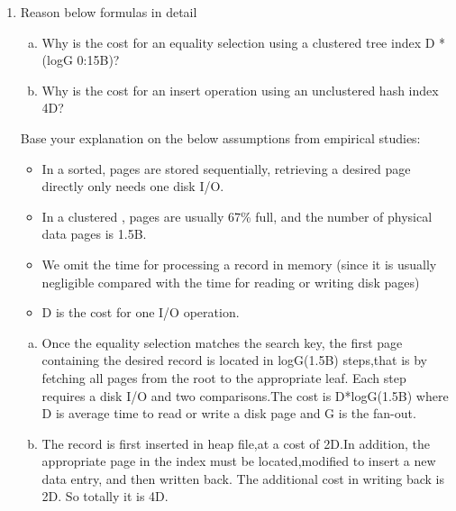 \documentclass[10pt]{article}
\begin{document}
	\begin{enumerate}
		\item Reason below formulas in detail
		
			\begin{enumerate}[(a)]
				\item Why is the cost for an equality selection using a clustered tree index D * (logG 0:15B)?
				
				\item Why is the cost for an insert operation using an unclustered hash index 4D?
			\end{enumerate}
			
			Base your explanation on the below assumptions from empirical studies:
			
			\begin{itemize}
				\item In a sorted, pages are stored sequentially, retrieving a desired page directly only
				needs one disk I/O.
				
				\item In a clustered , pages are usually 67\% full, and the number of physical data pages is
				1.5B.
				
				\item We omit the time for processing a record in memory (since it is usually negligible
				compared with the time for reading or writing disk pages)
				
				\item D is the cost for one I/O operation.
			\end{itemize}
		
		\begin{enumerate}[(a)]
			\item 	Once the equality selection matches the search key, the first page containing the desired record is located in logG(1.5B) steps,that is by fetching all pages from the root to the appropriate leaf. Each step requires a disk I/O and two comparisons.The cost is D*logG(1.5B) where D is average time to read or write a disk page and G is the fan-out.
			
			\item The record is first inserted in heap file,at a cost of 2D.In addition, the appropriate page in the index must be located,modified to insert a new data entry, and then written back. The additional
			cost in writing back is 2D. So totally it is 4D.
		\end{enumerate}
	
		
		

\end{enumerate}
\end{document}
